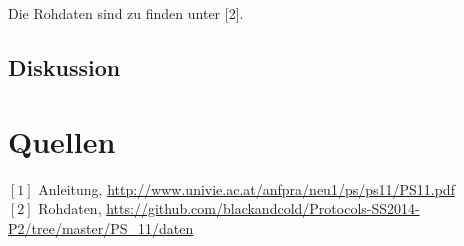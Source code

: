\documentclass[12pt,a4paper]{article}
\begin{document}
\begin{multicols}{2}
 




\noindent Die Rohdaten sind zu finden unter [2].

\subsection{Diskussion}


\section{Quellen}
$[1]$ Anleitung, \url{http://www.univie.ac.at/anfpra/neu1/ps/ps11/PS11.pdf}\\
$[2]$ Rohdaten, \url{htts://github.com/blackandcold/Protocols-SS2014-P2/tree/master/PS_11/daten}\\

\end{multicols}
\end{document}
